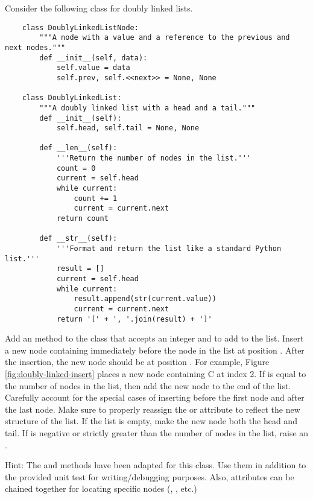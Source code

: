 \begin{problem}
  Consider the following class for doubly linked lists.

  \begin{lstlisting}
    class DoublyLinkedListNode:
        """A node with a value and a reference to the previous and next nodes."""
        def __init__(self, data):
            self.value = data
            self.prev, self.<<next>> = None, None
    
    class DoublyLinkedList:
        """A doubly linked list with a head and a tail."""
        def __init__(self):
            self.head, self.tail = None, None

        def __len__(self):
            '''Return the number of nodes in the list.'''
            count = 0
            current = self.head
            while current:
                count += 1
                current = current.next
            return count
    
        def __str__(self):
            '''Format and return the list like a standard Python list.'''
            result = []
            current = self.head
            while current:
                result.append(str(current.value))
                current = current.next
            return '[' + ', '.join(result) + ']'
  \end{lstlisting}

  Add an  method to the  class that accepts an integer  and  to add to the list.
  Insert a new node containing  immediately before the node in the list at position .
  After the insertion, the new node should be at position .
  For example, Figure \ref{fig:doubly-linked-insert} places a new node containing C at index 2.
  If  is equal to the number of nodes in the list, then add the new node to the end of the list.
  Carefully account for the special cases of inserting before the first node and after the last node.
  Make sure to properly reassign the  or  attribute to reflect the new structure of the list.
  If the list is empty, make the new node both the head and tail.
  If  is negative or strictly greater than the number of nodes in the list, raise an .
 
 
  Hint: The  and  methods have been adapted for this class.
  Use them in addition to the provided unit test for writing/debugging purposes.
  Also, attributes can be chained together for locating specific nodes (, , etc.)
  \label{prob:doubly-linked-list-insert}
 \end{problem}

